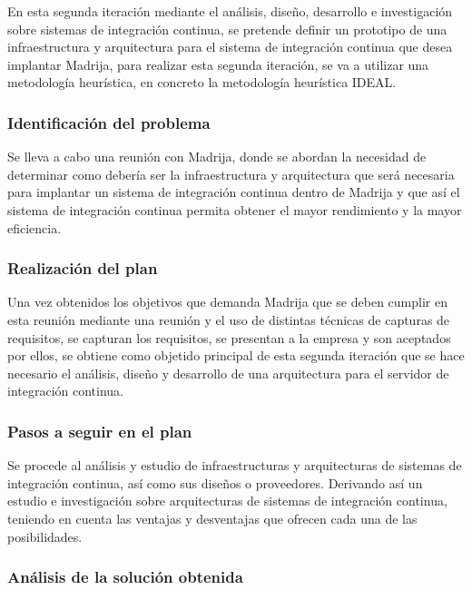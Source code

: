En esta segunda iteración mediante el análisis, diseño, desarrollo e investigación sobre sistemas de integración continua, se pretende definir un prototipo de una infraestructura y arquitectura para el sistema de integración continua que desea implantar \ac{Madrija}, para realizar esta segunda iteración, se va a utilizar una metodología heurística, en concreto la metodología heurística IDEAL.

\subsubsection{Identificación del problema}

Se lleva a cabo una reunión con \ac{Madrija}, donde se abordan la necesidad de determinar como debería ser la infraestructura y arquitectura que será necesaria para implantar un sistema de integración continua dentro de \ac{Madrija} y que así el sistema de integración continua permita obtener el mayor rendimiento y la mayor eficiencia.

\subsubsection{Realización del plan}

Una vez obtenidos los objetivos que demanda \ac{Madrija} que se deben cumplir en esta reunión mediante una reunión y el uso de distintas técnicas de capturas de requisitos, se capturan los requisitos, se presentan a la empresa y son aceptados por ellos, se obtiene como objetido principal de esta segunda iteración que se hace necesario el análisis, diseño y desarrollo de una arquitectura para el servidor de integración continua.

\subsubsection{Pasos a seguir en el plan}

Se procede al análisis y estudio de infraestructuras y arquitecturas de sistemas de integración continua, así como sus diseños o proveedores. Derivando así un estudio e investigación sobre arquitecturas de sistemas de integración continua, teniendo en cuenta las ventajas y desventajas que ofrecen cada una de las posibilidades.

\subsubsection{Análisis de la solución obtenida}

